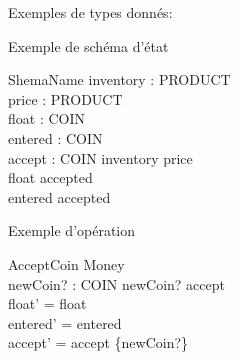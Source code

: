 \documentclass[12pt]{article}
\begin{document}
Exemples de types donnés:
\begin{zed}
\end{zed}


Exemple de schéma d'état
\begin{schema}{ShemaName}
  inventory : \bag PRODUCT\\
  price : PRODUCT \pfun \nat\\
  float : \bag COIN\\
  entered : \bag COIN\\
  accept : \power COIN
  \where
  \dom inventory \subseteq \dom price\\
  \dom float \subseteq accepted\\
  \dom entered \subseteq accepted
\end{schema}

Exemple d'opération
\begin{schema}{AcceptCoin}
\Delta Money\\
newCoin? : COIN
\where
newCoin? \notin accept\\
float' = float\\
entered' = entered\\
accept' = accept \cup \{newCoin?\}
\end{schema}
\end{document}
